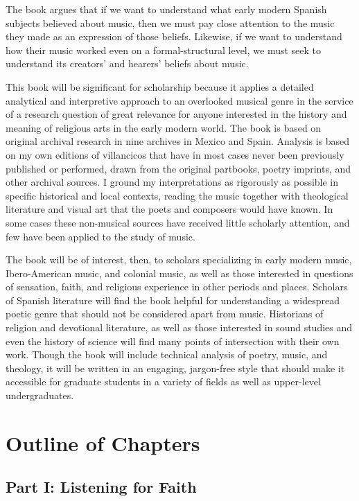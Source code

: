 \documentclass{vcbook-proposal}
\begin{document}
The book argues that if we want to understand what early modern Spanish 
subjects believed about music, then we must pay close attention to the music 
they made as an expression of those beliefs.
Likewise, if we want to understand how their music worked even on a 
formal-structural level, we must seek to understand its creators' and hearers' 
beliefs about music.

This book will be significant for scholarship because it applies a detailed
analytical and interpretive approach to an overlooked musical genre in the
service of a research question of great relevance for anyone interested in the
history and meaning of religious arts in the early modern world.
The book is based on original archival research in nine archives in Mexico and 
Spain.
Analysis is based on my own editions of villancicos that have in most cases 
never been previously published or performed, drawn from the original partbooks, 
poetry imprints, and other archival sources.
I ground my interpretations as rigorously as possible in specific historical 
and local contexts, reading the music together with theological literature and 
visual art that the poets and composers would have known.
In some cases these non-musical sources have received little scholarly 
attention, and few have been applied to the study of music.

The book will be of interest, then, to scholars specializing in early
modern music, Ibero-American music, and colonial music, as well as those
interested in questions of sensation, faith, and religious experience in other
periods and places.
Scholars of Spanish literature will find the book helpful for understanding a
widespread poetic genre that should not be considered apart from music.
Historians of religion and devotional literature, as well as those interested
in sound studies and even the history of science will find many points of
intersection with their own work.
Though the book will include technical analysis of poetry, music, and theology,
it will be written in an engaging, jargon-free style that should make it
accessible for graduate students in a variety of fields as well as upper-level
undergraduates. 

\section{Outline of Chapters}

\subsection{Part I: Listening for Faith}
\end{document}
